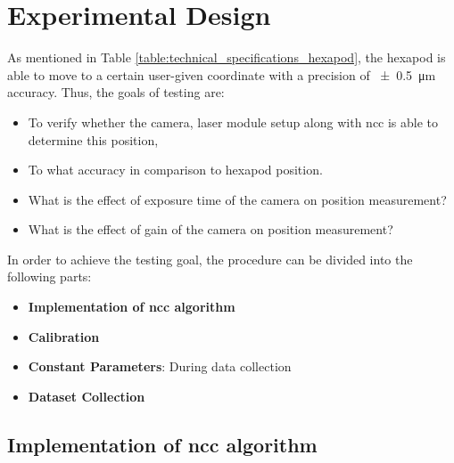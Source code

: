 \chapter{Experimental Design}

As mentioned in Table \ref{table:technical_specifications_hexapod}, the hexapod is able to move to a certain user-given coordinate with a precision of \SI{\pm0.5}{\micro\meter} accuracy. Thus, the goals of testing are:
\begin{itemize}
    \item To verify whether the camera, laser module setup along with \gls{ncc} is able to determine this position,
    \item To what accuracy in comparison to hexapod position.
    \item What is the effect of exposure time of the camera on position measurement?
    \item What is the effect of gain of the camera on position measurement?
\end{itemize}

\vspace{5mm}

\noindent In order to achieve the testing goal, the procedure can be divided into the following parts:

\begin{itemize}
    \item \textbf{Implementation of \gls{ncc} algorithm}
    \item \textbf{Calibration}
    \item \textbf{Constant Parameters}: During data collection 
    \item \textbf{Dataset Collection}
\end{itemize}


\section{Implementation of \gls{ncc} algorithm}\label{section:code_logic}
